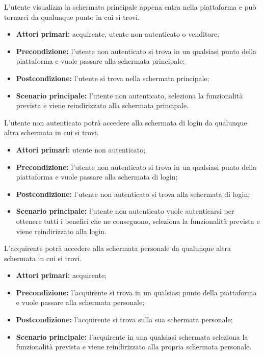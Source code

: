
L'utente visualizza la schermata principale appena entra nella piattaforma e può tornarci da qualunque punto in cui si trovi.
\begin{itemize}
	\item \textbf{Attori primari:} acquirente, utente non autenticato o venditore;
	\item \textbf{Precondizione:} l'utente non autenticato si trova in un qualsiasi punto della piattaforma e vuole passare alla schermata principale;
	\item \textbf{Postcondizione:} l'utente si trova nella schermata principale;
	\item \textbf{Scenario principale:} l'utente non autenticato, seleziona la funzionalità prevista e viene reindirizzato alla schermata principale. 
\end{itemize}

L'utente non autenticato potrà accedere alla schermata di login da qualunque altra schermata in cui si trovi.
\begin{itemize}
    \item \textbf{Attori primari:} utente non autenticato;
    \item \textbf{Precondizione:} l'utente non autenticato si trova in un qualsiasi punto della piattaforma e vuole passare alla schermata di login;
    \item \textbf{Postcondizione:} l'utente non autenticato si trova alla schermata di login;
    \item \textbf{Scenario principale:} l'utente non autenticato vuole autenticarsi per ottenere tutti i benefici che ne conseguono, seleziona la funzionalità prevista e viene reindirizzato alla login. 
\end{itemize}

L'acquirente potrà accedere alla schermata personale da qualunque altra schermata in cui si trovi.
\begin{itemize}
    \item \textbf{Attori primari:} acquirente;
    \item \textbf{Precondizione:} l'acquirente si trova in un qualsiasi punto della piattaforma e vuole passare alla schermata personale;
    \item \textbf{Postcondizione:} l'acquirente si trova sulla sua schermata personale;
    \item \textbf{Scenario principale:} l'acquirente in una qualsiasi schermata seleziona la funzionalità prevista e viene reindirizzato alla propria schermata personale. 
\end{itemize}
